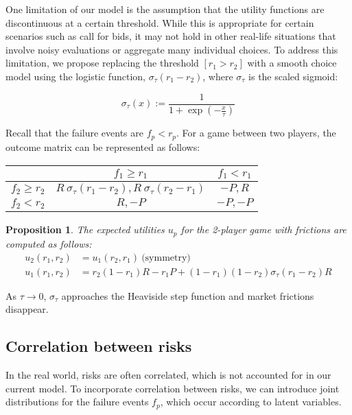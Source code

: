 \documentclass[preprint,12pt,authoryear]{elsarticle}
\newtheorem{proposition}[theorem]{Proposition}
\theoremstyle{definition}
\begin{document}
One limitation of our model is the assumption that the utility functions are discontinuous at a certain threshold. While this is appropriate for certain scenarios such as call for bids, it may not hold in other real-life situations that involve noisy evaluations or aggregate many individual choices. To address this limitation, we propose replacing the threshold $[r_1 > r_2]$ with a smooth choice model using the logistic function, $\sigma_\tau(r_1 - r_2)$, where $\sigma_\tau$ is the scaled sigmoid:

$$\sigma_\tau(x) := \frac{1}{1+\exp\left(-\frac{x}{\tau}\right)}$$


Recall that the failure events are $f_p < r_p$. For a game between two players, the outcome matrix can be represented as follows:
\begin{center}
\begin{tabular}{|c|c|c|}
\cline{2-3}
\multicolumn{1}{c|}{} & $f_1\ge r_1$ & $f_1<r_1$ \\
\hline
$f_2\ge r_2$ & $R~\sigma_\tau(r_1 - r_2), R~\sigma_\tau(r_2 - r_1) $ & $-P, R$ \\
\hline
$f_2<r_2$ & $R, -P$ &  $-P, -P$ \\
\hline
\end{tabular}
\end{center}

\begin{proposition}
\label{prop:frictions}
The expected utilities $u_p$ for the 2-player game with frictions are computed as follows:
\begin{align*}
    u_2(r_1, r_2) &= u_1(r_2, r_1) ~\text{(symmetry)}\\
    u_1(r_1, r_2) &= r_2 (1-r_1) R - r_1 P + (1-r_1)(1-r_2) \sigma_\tau(r_1 - r_2)R
\end{align*}
\end{proposition}

As $\tau \rightarrow 0$, $\sigma_\tau$ approaches the Heaviside step function and market frictions disappear.

\subsection{Correlation between risks}

In the real world, risks are often correlated, which is not accounted for in our current model. To incorporate correlation between risks, we can introduce joint distributions for the failure events $f_p$, which occur according to latent variables.
\end{document}
